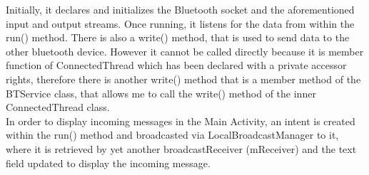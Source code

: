 \documentclass[12pt,a4paper]{article}
\begin{document}
    Initially, it declares and initializes the Bluetooth socket and the aforementioned input and output streams. Once running, it listens for the data from within the run() method. There is also a write() method, that is used to send data to the other bluetooth device. However it cannot be called directly because it is member function of ConnectedThread which has been declared with a private accessor rights, therefore there is another write() method that is a member method of the BTService class, that allows me to call the write() method of the inner ConnectedThread class.\\
    
    In order to display incoming messages in the Main Activity, an intent is created within the run() method and broadcasted via LocalBroadcastManager to it, where it is retrieved by yet another broadcastReceiver (mReceiver) and the text field updated to display the incoming message.~\cite{bib:uiLink}
    
\end{document}
